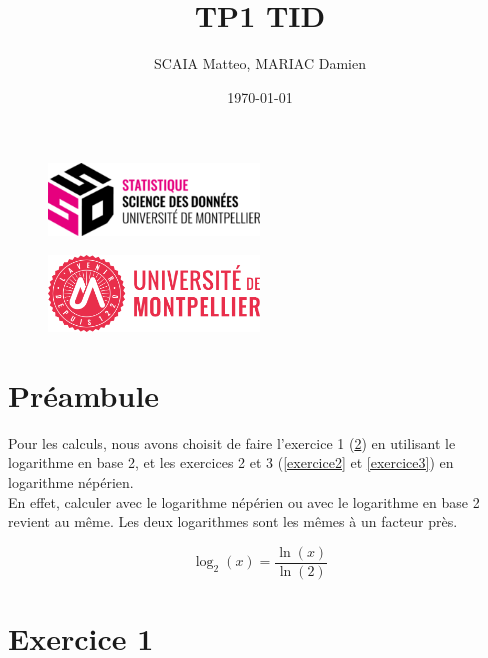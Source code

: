 \documentclass{article}
\title{TP1 TID}
\author{SCAIA Matteo, MARIAC Damien}
\date{\today}
\begin{document}
\maketitle

\begin{figure}[h] 
    \centering
    \includegraphics[width=0.5\textwidth]{ssd_logo.png} 
\end{figure}

\begin{figure}[h] 
    \centering
    \includegraphics[width=0.5\textwidth]{logo_um_2022_rouge_RVB.png} 
\end{figure}

\newpage

\setcounter{section}{-1}
\tableofcontents

\newpage
\section{Préambule}
Pour les calculs, nous avons choisit de faire l'exercice 1 (\ref{Exercice1}) en utilisant le logarithme en base 2, et les exercices 2 et 3 (\ref{exercice2} et \ref{exercice3}) en logarithme népérien.\\
En effet, calculer avec le logarithme népérien ou avec le logarithme en base 2 revient au même. Les deux logarithmes sont les mêmes à un facteur près.


\[
\log_2(x) = \frac{\ln(x)}{\ln(2)}
\]


\section{Exercice 1}
\label{Exercice1}
\end{document}
